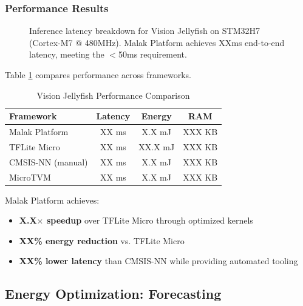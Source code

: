 \subsubsection{Performance Results}

\begin{figure}[h]
\centering
\resizebox{0.48\textwidth}{!}{}
\caption{Inference latency breakdown for Vision Jellyfish on STM32H7 (Cortex-M7 @ 480MHz). Malak Platform achieves XXms end-to-end latency, meeting the $<$50ms requirement.}
\label{fig:jellyfish_latency}
\end{figure}

Table \ref{tab:jellyfish_perf} compares performance across frameworks.

\begin{table}[h]
\centering
\caption{Vision Jellyfish Performance Comparison}
\label{tab:jellyfish_perf}
\begin{tabular}{lccc}
\hline
\textbf{Framework} & \textbf{Latency} & \textbf{Energy} & \textbf{RAM} \\
\hline
Malak Platform & XX ms & X.X mJ & XXX KB \\
TFLite Micro & XX ms & XX.X mJ & XXX KB \\
CMSIS-NN (manual) & XX ms & X.X mJ & XXX KB \\
MicroTVM & XX ms & X.X mJ & XXX KB \\
\hline
\end{tabular}
\end{table}

Malak Platform achieves:
\begin{itemize}
\item \textbf{X.X$\times$ speedup} over TFLite Micro through optimized kernels
\item \textbf{XX\% energy reduction} vs. TFLite Micro
\item \textbf{XX\% lower latency} than CMSIS-NN while providing automated tooling
\end{itemize}


\subsection{Energy Optimization: Forecasting}

